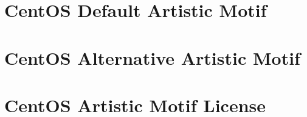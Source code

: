 
\section{CentOS Default Artistic Motif}
\section{CentOS Alternative Artistic Motif}
\section{CentOS Artistic Motif License}
